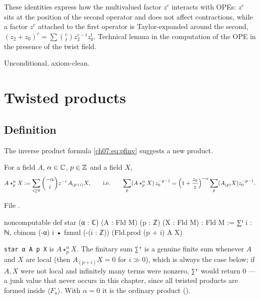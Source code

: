 \begin{physics}
These identities express how the multivalued factor $z^c$ interacts with OPEs: $z^c$ sits at the position of the second operator and does not affect contractions, while a factor $z^c$ attached to the first operator is Taylor-expanded around the second, $(z_2+z_0)^c=\sum\binom ct z_2^{c-t}z_0^t$. Technical lemma in the computation of the OPE in the presence of the twist field.
\end{physics}

\begin{status}
Unconditional, axiom-clean.
\end{status}

\section{Twisted products}\label{ch07:sec:star}

\subsection{Definition}

The inverse product formula \eqref{ch07:eq:pfinv} suggests a new product.

\begin{definition}\label{ch07:def:star}
For a field $A$, $\alpha\in{\mathbb{C}}$, $p\in{\mathbb{Z}}$ and a field $X$,
\begin{equation*}
  A\star^{\alpha}_{p}X := \sum_{i\ge0}\binom{-\alpha}{i}z^{-i}\,A_{(p+i)}X,
  \qquad\text{i.e.}\qquad \sum_p (A\star^\alpha_pX)\,z_0^{-p-1} = \Bigl(1+\frac{z_0}{z}\Bigr)^{-\alpha}
  \sum_p (A_{(p)}X)z_0^{-p-1}.
\end{equation*}
\end{definition}

\noindent File .
\begin{leancode}
noncomputable def star (α : ℂ) (A : Fld M) (p : ℤ) (X : Fld M) : Fld M :=
  ∑ᶠ i : ℕ, cbinom (-α) i • fzmul (-(i : ℤ)) (Fld.prod (p + i) A X)
\end{leancode}

\begin{dictionary}
\verb|star α A p X| is $A\star^\alpha_pX$. The finitary sum \verb|∑ᶠ| is a genuine finite sum
whenever $A$ and $X$ are local (then $A_{(p+i)}X = 0$ for $i\gg0$), which is always the case
below; if $A,X$ were not local and infinitely many terms were nonzero, \verb|∑ᶠ| would return
$0$ --- a junk value that never occurs in this chapter, since all twisted products are formed
inside $\langle F_a\rangle$. With $\alpha=0$ it is the ordinary product ().
\end{dictionary}


